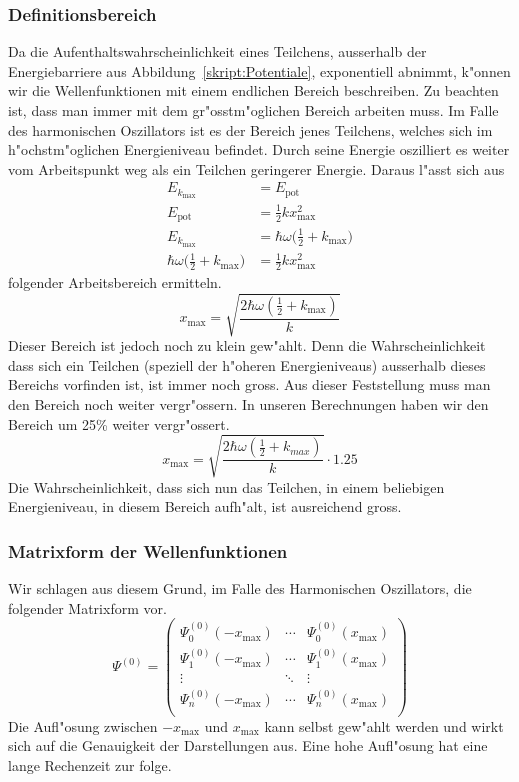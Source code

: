 \begin{refsection}
\subsubsection{Definitionsbereich}
Da die  Aufenthaltswahrscheinlichkeit eines Teilchens,
ausserhalb der Energiebarriere aus Abbildung~\ref{skript:Potentiale},
exponentiell abnimmt,
k"onnen wir die Wellenfunktionen mit einem endlichen Bereich beschreiben.
Zu beachten ist,
dass man immer mit dem gr"osstm"oglichen Bereich arbeiten muss.
Im Falle des harmonischen Oszillators ist es der Bereich jenes Teilchens,
welches sich im h"ochstm"oglichen Energieniveau befindet.
Durch seine Energie oszilliert es weiter vom Arbeitspunkt weg
als ein Teilchen geringerer Energie.
Daraus l"asst sich aus
\begin{align*} 
E_{k_{\text{max}}}
&=
E_{\text{pot}}
\\
E_{\text{pot}}
&=
\frac12 kx_{\text{max}}^2
\\
E_{k_{\text{max}}}
&=
\hbar\omega\biggl(\frac12+k_{\text{max}}\biggr)
\\
\hbar\omega\biggl(\frac12+k_{\text{max}}\biggr)
&=
\frac12 kx_{\text{max}}^2
\end{align*}
folgender Arbeitsbereich ermitteln.
\[
x_{\text{max}}
=
\sqrt{\frac{2\hbar\omega(\frac12+k_{\text{max}})}k}
\]
Dieser Bereich ist jedoch noch zu klein gew"ahlt.
Denn die Wahrscheinlichkeit dass sich ein Teilchen
(speziell der h"oheren Energieniveaus) ausserhalb dieses Bereichs vorfinden ist,
ist immer noch gross.
Aus dieser Feststellung muss man den Bereich noch weiter vergr"ossern.
In unseren Berechnungen haben wir den Bereich um 25\% weiter vergr"ossert.
\[
x_{\text{max}}
=
\sqrt{\frac{2\hbar\omega(\frac12+k_{max})}k}\cdot 1.25
\]
Die Wahrscheinlichkeit,
dass sich nun das Teilchen, in einem beliebigen Energieniveau, in diesem Bereich aufh"alt,
ist ausreichend gross.
\subsubsection{Matrixform der Wellenfunktionen}
Wir schlagen aus diesem Grund,
im Falle des Harmonischen Oszillators, die folgender Matrixform vor.
\[
\Psi^{(0)}
=
\begin{pmatrix}
\Psi_0^{(0)}(-x_{\text{max}}) & \cdots & \Psi_0^{(0)}(x_{\text{max}})	\\
\Psi_1^{(0)}(-x_{\text{max}}) & \cdots & \Psi_1^{(0)}(x_{\text{max}})	\\
\vdots & \ddots & \vdots						\\
\Psi_n^{(0)}(-x_{\text{max}}) & \cdots & \Psi_n^{(0)}(x_{\text{max}})	\\
\end{pmatrix}
\]
Die Aufl"osung zwischen $-x_{\text{max}}$ und $x_{\text{max}}$ kann selbst
gew"ahlt werden und wirkt sich auf die Genauigkeit der Darstellungen aus.
Eine hohe Aufl"osung hat eine lange Rechenzeit zur folge.


\end{refsection}
